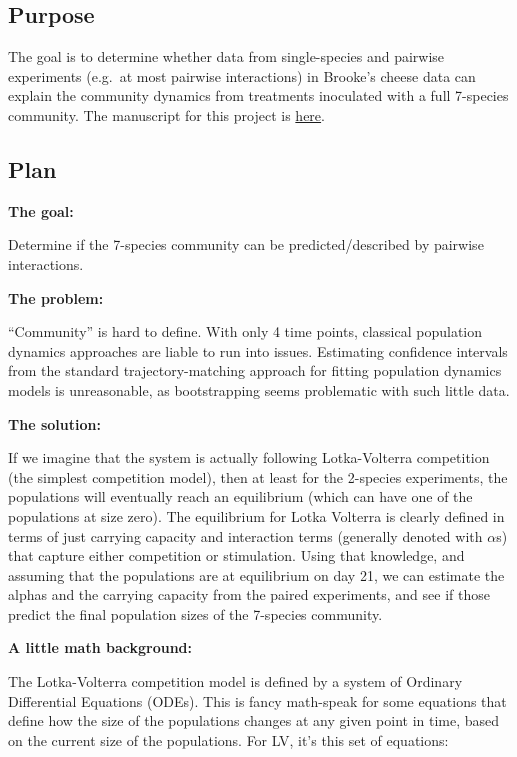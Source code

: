\documentclass[
]{article}
\begin{document}
\hypertarget{purpose}{%
\subsection{Purpose}\label{purpose}}

The goal is to determine whether data from single-species and pairwise
experiments (e.g.~at most pairwise interactions) in Brooke's cheese data
can explain the community dynamics from treatments inoculated with a
full 7-species community. The manuscript for this project is
\href{https://docs.google.com/document/u/1/d/1KIhnJMmHf3wOXv_0DQ9UgcjIVkz1v0FGFiyUVdktreE/edit?ts=608b2425}{here}.

\hypertarget{plan}{%
\subsection{Plan}\label{plan}}

\textbf{The goal:}

Determine if the 7-species community can be predicted/described by
pairwise interactions.

\textbf{The problem:}

``Community'' is hard to define. With only 4 time points, classical
population dynamics approaches are liable to run into issues. Estimating
confidence intervals from the standard trajectory-matching approach for
fitting population dynamics models is unreasonable, as bootstrapping
seems problematic with such little data.

\textbf{The solution:}

If we imagine that the system is actually following Lotka-Volterra
competition (the simplest competition model), then at least for the
2-species experiments, the populations will eventually reach an
equilibrium (which can have one of the populations at size zero). The
equilibrium for Lotka Volterra is clearly defined in terms of just
carrying capacity and interaction terms (generally denoted with
\(\alpha\)s) that capture either competition or stimulation. Using that
knowledge, and assuming that the populations are at equilibrium on day
21, we can estimate the alphas and the carrying capacity from the paired
experiments, and see if those predict the final population sizes of the
7-species community.

\textbf{A little math background:}

The Lotka-Volterra competition model is defined by a system of Ordinary
Differential Equations (ODEs). This is fancy math-speak for some
equations that define how the size of the populations changes at any
given point in time, based on the current size of the populations. For
LV, it's this set of equations:
\end{document}
